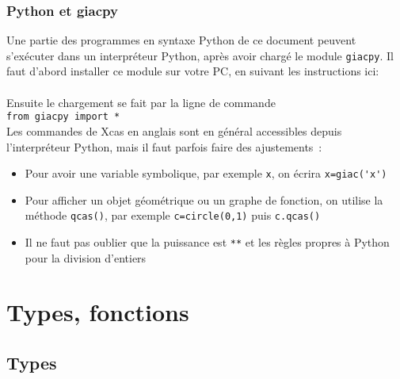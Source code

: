 \documentclass[12pt,a4paper]{book}
\begin{document}
\begin{giacjshere}
\subsection{Python et giacpy}
Une partie des programmes en syntaxe Python de ce document peuvent
s'ex\'ecuter dans un interpr\'eteur Python, apr\`es avoir charg\'e
le module \verb|giacpy|. Il faut d'abord installer
ce module sur votre PC, en suivant les instructions ici:\\
\\
Ensuite le chargement se fait par la ligne de commande\\
\verb|from giacpy import *|\\
Les commandes de Xcas en anglais
sont en g\'en\'eral accessibles depuis l'interpr\'eteur
Python, mais il faut parfois faire des ajustements~:
\begin{itemize}
\item Pour avoir une variable symbolique, par exemple \verb|x|, 
on \'ecrira \verb|x=giac('x')|
\item Pour afficher un objet g\'eom\'etrique ou un graphe de fonction,
on utilise la m\'ethode \verb|qcas()|, par exemple
\verb|c=circle(0,1)| puis \verb|c.qcas()|
\item Il ne faut pas oublier que la puissance est \verb|**| et les r\`egles
propres \`a Python pour la division d'entiers
\end{itemize}


\chapter{Types, fonctions}
\section{Types}

\end{giacjshere}
\end{document}
